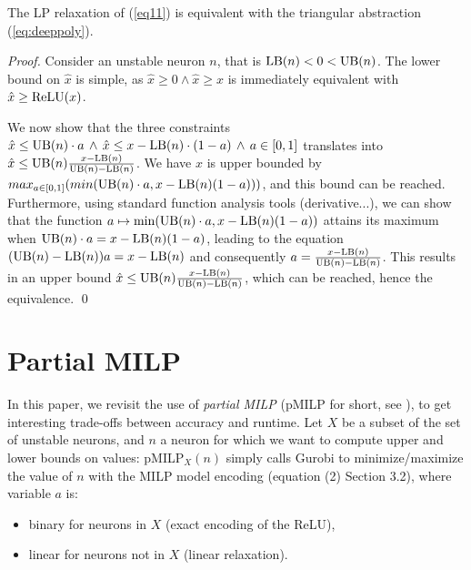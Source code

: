 



\begin{proposition}
	\cite{alessandro}
	\label{LP}
	The LP relaxation of (\ref{eq11}) is equivalent with the triangular abstraction 	(\ref{eq:deeppoly}).
\end{proposition}
 




\begin{proof}
	Consider an unstable neuron $n$, that is $\mathrm{LB}(n) < 0 < \mathrm{UB}(n)$.
The lower bound on $\hat{x}$ is simple, as $\hat{x} \geq 0 \wedge \hat{x} \geq x$ is immediately equivalent with $\hat{x} \geq \mathrm{ReLU}(x)$.

We now show that the three constraints 
$\hat{x} \leq \mathrm{UB}(n) \cdot a \, \wedge \, \hat{x} \leq x-\mathrm{LB}(n) \cdot (1-a) \, \wedge \, a \in [0,1]$ translates into $\hat{x} \leq \mathrm{UB}(n) \frac{x-\mathrm{LB}(n)}{\mathrm{UB}(n)-\mathrm{LB}(n)}$. 
We have $\hat{x}$ is upper bounded by $max_{a \in [0,1]} (min(\mathrm{UB}(n) \cdot a, x - \mathrm{LB}(n) (1-a)))$, and this bound can be reached. Furthermore, using standard function analysis tools (derivative...), we can show that the function $a \mapsto \min(\mathrm{UB}(n) \cdot a, x - \mathrm{LB}(n) (1-a))$ attains its maximum when $\mathrm{UB}(n) \cdot a = x - \mathrm{LB}(n) (1-a)$, leading to the equation $(\mathrm{UB}(n) - \mathrm{LB}(n)) a = x - \mathrm{LB}(n)$ and consequently $a = \frac{x - \mathrm{LB}(n)}{\mathrm{UB}(n)-\mathrm{LB}(n)}$. This results in an upper bound $\hat{x} \leq \mathrm{UB}(n) \frac{x - \mathrm{LB}(n)}{\mathrm{UB}(n)-\mathrm{LB}(n)}$, which can be reached, hence the equivalence.
\qed
\end{proof}













\section{Partial MILP}	


In this paper, we revisit the use of {\em partial MILP} (pMILP for short, see \cite{DivideAndSlide}), to get interesting trade-offs between accuracy and runtime.
Let $X$ be a subset of the set of unstable neurons, and $n$ a neuron for which we want to compute upper and lower bounds on values: pMILP$_X(n)$ simply calls Gurobi to minimize/maximize the value of $n$ with the MILP model encoding (equation (2) Section 3.2), where variable $a$ is:
\begin{itemize}
\item binary for neurons in $X$ (exact encoding of the ReLU),
\item linear for neurons not in $X$ (linear relaxation).
\end{itemize}



